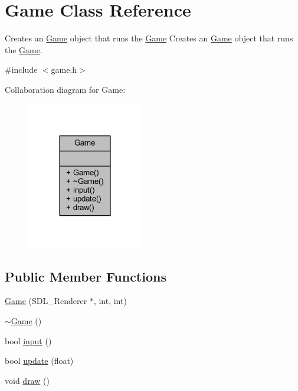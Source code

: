 \hypertarget{class_game}{\section{Game Class Reference}
\label{class_game}
}


Creates an \hyperlink{class_game}{Game} object that runs the \hyperlink{class_game}{Game} Creates an \hyperlink{class_game}{Game} object that runs the \hyperlink{class_game}{Game}.  




{\ttfamily \#include $<$game.\+h$>$}



Collaboration diagram for Game\+:
\nopagebreak
\begin{figure}[H]
\begin{center}
\leavevmode
\includegraphics[width=144pt]{class_game__coll__graph}
\end{center}
\end{figure}
\subsection*{Public Member Functions}
\begin{DoxyCompactItemize}
\item 
\hyperlink{class_game_aa16f7f0fe07387c1fda7f27858b2ff66}{Game} (S\+D\+L\+\_\+\+Renderer $\ast$, int, int)
\item 
\hyperlink{class_game_ae3d112ca6e0e55150d2fdbc704474530}{$\sim$\+Game} ()
\item 
bool \hyperlink{class_game_a6e3ee4ac1c5ee591527cd13cfb4cfab2}{input} ()
\item 
bool \hyperlink{class_game_a34db1b512678bf1bf0bd8e0d56723b18}{update} (float)
\item 
void \hyperlink{class_game_a6d54497ce3a66f6dd45eacfdccc8d0bd}{draw} ()
\end{DoxyCompactItemize}


